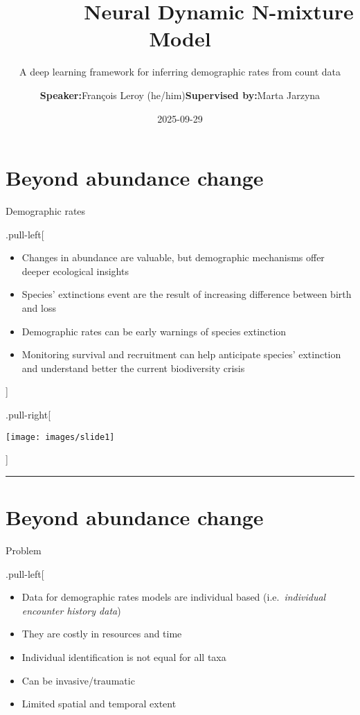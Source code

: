 \documentclass[
]{article}
\title{    Neural Dynamic N-mixture Model}
\subtitle{A deep learning framework for inferring demographic rates from
count data}
\author{\textbf{Speaker:}François Leroy (he/him)\textbf{Supervised
by:}Marta Jarzyna}
\date{2025-09-29}
\begin{document}
\maketitle

\section{Beyond abundance change}\label{beyond-abundance-change}

Demographic rates

.pull-left{[}

\begin{itemize}
\item
  Changes in abundance are valuable, but demographic mechanisms offer
  deeper ecological insights
\item
  Species' extinctions event are the result of increasing difference
  between birth and loss
\item
  Demographic rates can be early warnings of species extinction
\item
  Monitoring survival and recruitment can help anticipate species'
  extinction and understand better the current biodiversity crisis
\end{itemize}

{]}

.pull-right{[}

\texttt{[image: images/slide1]}

{]}

\begin{center}\rule{0.5\linewidth}{0.5pt}\end{center}

\section{Beyond abundance change}\label{beyond-abundance-change-1}

Problem

.pull-left{[}

\begin{itemize}
\item
  Data for demographic rates models are individual based
  (i.e.~\emph{individual encounter history data})
\item
  They are costly in resources and time
\item
  Individual identification is not equal for all taxa
\item
  Can be invasive/traumatic
\item
  Limited spatial and temporal extent
\end{itemize}
\end{document}
